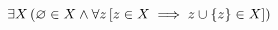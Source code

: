 \documentclass{minimal}
\newcommand \paren [1] {\left({#1}\right)}
\renewcommand \brack [1] {\left[{#1}\right]}
\renewcommand \brace [1] {\left\{{#1}\right\}}
\renewcommand \empty {\ensuremath\varnothing}
\begin{document}
\begin{displaymath}
\exists X\paren{\empty\in X\land \forall z\brack{z\in X\implies z\cup\brace{z}\in X}}
\end{displaymath}
\end{document}
